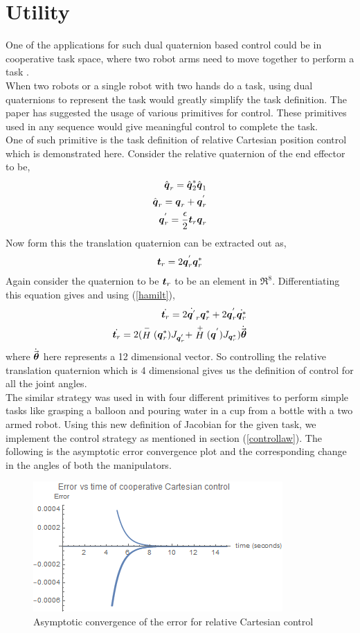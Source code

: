 \documentclass[a4paper,12pt]{article}
\newcommand{\Hp}{\ensuremath{\stackrel{+}{H}}\xspace}
\newcommand{\Hn}{\ensuremath{\stackrel{-}{H}}\xspace}
\begin{document}
\section{Utility}
One of the applications for such dual quaternion based control could be in cooperative task space, where two robot arms need to move together to perform a task \cite{adorno2010dual}.\\
When two robots or a single robot with two hands do a task, using dual quaternions to represent the task would greatly simplify the task definition. The paper has suggested the usage of various primitives for control. These primitives used in any sequence would give meaningful control to complete the task.\\
One of such primitive is the task definition of relative Cartesian position control which is demonstrated here. Consider the relative quaternion of the end effector to be,
\begin{align}
	\hat{\boldsymbol{q}}_r = \hat{\boldsymbol{q}}^{*}_{2}\hat{\boldsymbol{q}}_{1}\\
	\hat{\boldsymbol{q}}_r = \boldsymbol{q}_r + \boldsymbol{q}^{'}_r\\
	\boldsymbol{q}^{'}_r = \frac{\epsilon}{2}\boldsymbol{t}_r \boldsymbol{q}_r
\end{align}
Now form this the translation quaternion can be extracted out as, 
\begin{align}
	\boldsymbol{t}_r = 2\boldsymbol{q}^{'}_r\boldsymbol{q}^{*}_r
\end{align}
Again consider the quaternion to be $\boldsymbol{t}_r$ to be an element in $\Re^{8}$. Differentiating this equation gives and using (\ref{hamilt}),
\begin{align}
	\dot{\bt_r} = 2\dot{\bq^{'}}_r\bq^{*}_r+2\bq^{'}_r\dot{\bq^{*}_r}\\
	\dot{\bt_r} = 2(\Hn(\bq^{*}_r)J_{\bq^{'}_r}+\Hp(\bq^{'})J_{\bq^{*}_r})\dot{\vec{\bth}}
\end{align}
where $\dot{\vec{\boldsymbol{\theta}}}$ here represents a 12 dimensional vector. So controlling the relative translation quaternion which is 4 dimensional gives us the definition of control for all the joint angles. \\
The similar strategy was used in \cite{adorno2010dual} with four different primitives to perform simple tasks like grasping a balloon and pouring water in a cup from a bottle with a two armed robot.
Using this new definition of Jacobian for the given task, we implement the control strategy as mentioned in section (\ref{controllaw}).
The following is the asymptotic error convergence plot and the corresponding change in the angles of both the manipulators.
\begin{figure}[H]
	\centering
	\includegraphics[scale=0.8]{dqc_ctc_error}
	\caption{Asymptotic convergence of the error for relative Cartesian control}
\end{figure}
\end{document}
